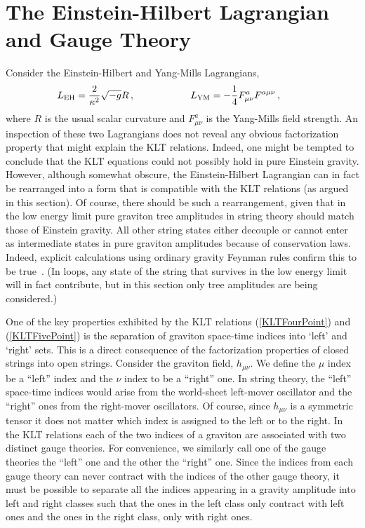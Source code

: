 \documentclass[12pt]{livrev}
\begin{document}
\newpage

\section{The Einstein-Hilbert Lagrangian and Gauge Theory}
\label{section:EinsteinHilbert}

Consider the Einstein-Hilbert and Yang-Mills Lagrangians,
%
\begin{equation}
L_{\rm EH} = {2 \over \kappa^2} \sqrt{-g} R \,, \hskip 2 cm 
L_{\rm YM} = - {1\over 4} F^a_{\mu\nu} F^{a\mu\nu}\,, \hskip 1 cm 
\end{equation}
%
where $R$ is the usual scalar curvature and $F_{\mu\nu}^a$ is the
Yang-Mills field strength. An inspection of these two Lagrangians does
not reveal any obvious factorization property that might explain the
KLT relations.  Indeed, one might be tempted to conclude that the KLT
equations could not possibly hold in pure Einstein gravity.  However, 
although somewhat obscure, the Einstein-Hilbert Lagrangian can in fact be 
rearranged into a form that is  compatible with the KLT relations (as 
argued in this section). Of course,  there should be such a rearrangement, 
given that in the low energy limit pure graviton tree
amplitudes in string theory should match those of Einstein gravity.
All other string states either decouple or cannot enter as
intermediate states in pure graviton amplitudes because of
conservation laws.  Indeed, explicit calculations using ordinary
gravity Feynman rules confirm this to be
true~\cite{Sannan86,BernGrant,Square}. (In loops, any state of the string
that survives in the low energy limit will in fact contribute, but
in this section only tree amplitudes are being considered.)

One of the key properties exhibited by the KLT relations
(\ref{KLTFourPoint}) and (\ref{KLTFivePoint}) is the separation of
graviton space-time indices into `left' and `right' sets. This is a
direct consequence of the factorization properties of closed strings
into open strings.  Consider the graviton field, $h_{\mu\nu}$.  We
define the $\mu$ index be a ``left'' index and the $\nu$ index to be a
``right'' one.  In string theory, the ``left'' space-time indices would
arise from the world-sheet left-mover oscillator and the ``right'' ones
from the right-mover oscillators.  Of course, since $h_{\mu\nu}$ is a
symmetric tensor it does not matter which index is assigned to the
left or to the right.  In the KLT relations each of the two indices of
a graviton are associated with two distinct gauge theories. For
convenience, we similarly call one of the gauge theories the ``left''
one and the other the ``right'' one. Since the indices from each
gauge theory can never contract with the indices of the other gauge
theory, it must be possible to separate all the indices appearing in a
gravity amplitude into left and right classes such that the ones in
the left class only contract with left ones and the ones in the right
class, only with right ones. 
\end{document}
